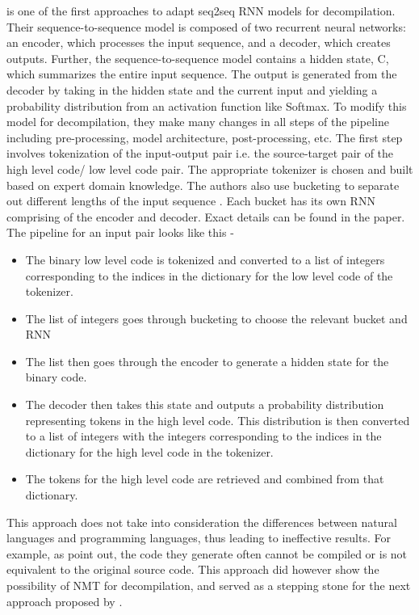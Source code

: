 \documentclass{article}
\begin{document}
\citet{katz2018using} is one of the first approaches to adapt seq2seq RNN models for decompilation. Their sequence-to-sequence model is composed of two recurrent neural networks: an encoder, which processes the input sequence, and a decoder,
which creates outputs. Further, the sequence-to-sequence model contains a hidden state, C, which summarizes the entire input sequence. The output is generated from the decoder by taking in the hidden state and the current input and yielding a probability distribution from an activation function like Softmax. To modify this model for decompilation, they make many changes in all steps of the pipeline including pre-processing, model architecture, post-processing, etc. The first step involves tokenization of the input-output pair i.e. the source-target pair of the high level code/ low level code pair. The appropriate tokenizer is chosen and built based on expert domain knowledge. The authors also use bucketing to separate out different lengths of the input sequence \cite{bucketing}. Each bucket has its own RNN comprising of the encoder and decoder. Exact details can be found in the paper. The pipeline for an input pair looks like this - 
\begin{itemize}
    \item The binary low level code is tokenized and converted to a list of integers corresponding to the indices in the dictionary for the low level code of the tokenizer.
    \item The list of integers goes through bucketing to choose the relevant bucket and RNN
    \item The list then goes through the encoder to generate a hidden state for the binary code.
    \item The decoder then takes this state and outputs a probability distribution representing tokens in the high level code. This distribution is then converted to a list of integers with the integers corresponding to the indices in the dictionary for the high level code in the tokenizer.
    \item The tokens for the high level code are retrieved and combined from that dictionary.
\end{itemize}

This approach does not take into consideration the differences between natural languages and programming languages, thus leading to ineffective results. For example, as \citet{katz2019towards} point out, the code they generate often cannot be compiled or is not equivalent to the original source code. This approach did however show the possibility of NMT for decompilation, and served as a stepping stone for the next approach proposed by \citet{katz2019towards}. 
\end{document}
